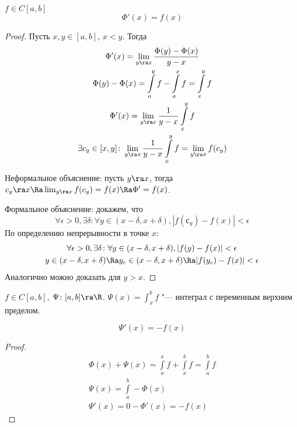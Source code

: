 \begin{theorem}[Барроу]
	$f \in C[a, b]$
	\[\Phi'(x) = f(x)\]
\end{theorem}
\begin{proof}
	Пусть $x, y \in [a, b]$, $x < y$.
	Тогда
	\begin{gather*}
		\Phi'(x) = \lim_{y \ra x} \frac{\Phi (y) - \Phi(x)}{y - x} \\
		\Phi (y) - \Phi (x) = \int\limits_a^y f - \int\limits_a^x f = \int\limits_x^y f \\
		\Phi' (x) = \lim_{y \ra x} \frac{1}{y - x} \int\limits_x^y f \\
		\exists c_y \in [x, y]\colon \lim_{y \ra x} \frac{1}{y - x} \int\limits_x^y f = \lim_{y \ra x} f(c_y)
	\end{gather*}

	Неформальное объяснение: пусть $y \ra x$, тогда $c_y \ra x \Ra \lim_{y \ra x} f(c_y) = f(x) \Ra \Phi' = f(x)$.

	Формальное объяснение: докажем, что
	\[ \forall \epsilon > 0, \exists \delta\colon \forall y \in (x - \delta, x + \delta), |f(с_y) - f(x)| < \epsilon \]
	По определению непрерывности в точке $x$:
	\begin{gather*}
		\forall \epsilon > 0, \exists \delta\colon \forall y \in (x - \delta, x + \delta), |f(y) - f(x)| < \epsilon \\
		y \in (x - \delta, x + \delta) \Ra y_c \in (x - \delta, x + \delta) \Ra |f(y_c) - f(x)| < \epsilon
	 \end{gather*}
	Аналогично можно доказать для $y > x$.
\end{proof}

\begin{Def}
	$f \in C[a, b]$, $\Psi \colon [a, b] \ra \R$.
	$\Psi (x) = \int_x^b f$ "--- интеграл с переменным верхним пределом.
\end{Def}

\begin{conseq}
	\[ \Psi'(x) = -f(x) \]
\end{conseq}
\begin{proof}
	\begin{gather*}
		\Phi (x) + \Psi (x) = \int\limits_a^x f + \int\limits_x^b f = \int\limits_a^b f \\
		\Psi(x) = \int\limits_a^b - \Phi(x)\\
		\Psi'(x) =  0 - \Phi'(x) = -f(x)
	\end{gather*}
\end{proof}

